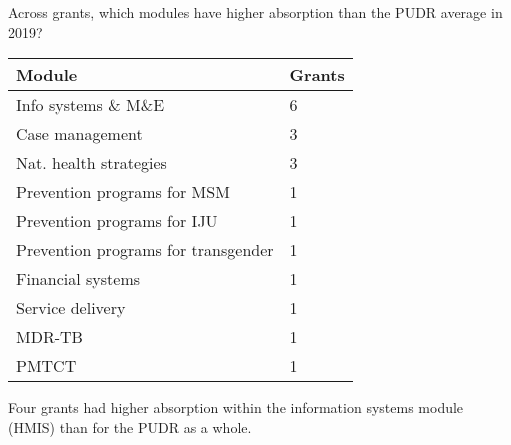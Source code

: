 \documentclass[ignorenonframetext,]{beamer}
\begin{document}
\begin{frame}{Across grants, which modules have higher absorption than
the PUDR average in 2019?}
\protect\hypertarget{across-grants-which-modules-have-higher-absorption-than-the-pudr-average-in-2019}{}

\begin{table}[H]
\centering\begingroup\fontsize{8}{10}\selectfont

\begin{tabular}{l|l}
\hline
Module & Grants\\
\hline
Info systems \& M\&E & 6\\
\hline
Case management & 3\\
\hline
Nat. health strategies & 3\\
\hline
Prevention programs for MSM & 1\\
\hline
Prevention programs for IJU & 1\\
\hline
Prevention programs for transgender & 1\\
\hline
Financial systems & 1\\
\hline
Service delivery & 1\\
\hline
MDR-TB & 1\\
\hline
PMTCT & 1\\
\hline
\end{tabular}\endgroup{}
\end{table}

Four grants had higher absorption within the information systems module
(HMIS) than for the PUDR as a whole.

\end{frame}
\end{document}

